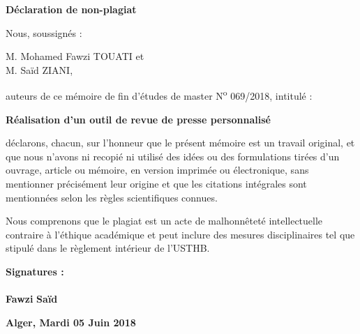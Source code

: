 \newpage
\vspace*{1.2cm}
\begin{center}
    \Large
    \textbf{Déclaration de non-plagiat}
\end{center}
\vspace*{2.5cm}
Nous, soussignés :
\vspace*{0.5cm}

M. Mohamed Fawzi TOUATI et\\
M. Saïd ZIANI,
\vspace*{1cm}

auteurs de ce mémoire de fin d'études de master N\textsuperscript{o} 069/2018, intitulé :
\begin{center}
\large
\textbf{
Réalisation d'un outil de revue de presse personnalisé
}
\end{center}
\vspace*{1.2cm}


déclarons, chacun, sur l'honneur que le présent mémoire est un travail original, et que nous n'avons ni recopié ni utilisé des idées ou des formulations tirées d'un ouvrage, article ou mémoire, en version imprimée ou électronique, sans mentionner précisément leur origine et que les citations intégrales sont mentionnées selon les règles scientifiques connues. 

Nous comprenons que le plagiat est un acte de malhonnêteté intellectuelle contraire à l'éthique académique et peut inclure des mesures disciplinaires tel que stipulé dans le règlement intérieur de l'USTHB.


\vspace*{3cm}
\textbf{Signatures :}\\\\
\hspace*{3cm}
\textbf{Fawzi}
\hspace*{6cm}
\textbf{Saïd}


\vspace*{3cm}
\hspace*{9cm}
\textbf{Alger, Mardi 05 Juin 2018}
